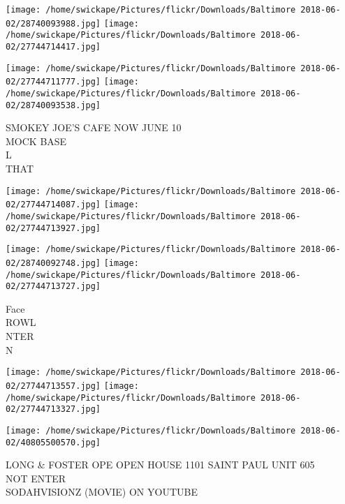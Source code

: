 \documentclass[10pt,letterpaper]{article}
\begin{document}
\texttt{[image: /home/swickape/Pictures/flickr/Downloads/Baltimore 2018-06-02/28740093988.jpg]}
\texttt{[image: /home/swickape/Pictures/flickr/Downloads/Baltimore 2018-06-02/27744714417.jpg]}

\texttt{[image: /home/swickape/Pictures/flickr/Downloads/Baltimore 2018-06-02/27744711777.jpg]}
\texttt{[image: /home/swickape/Pictures/flickr/Downloads/Baltimore 2018-06-02/28740093538.jpg]}

SMOKEY JOE'S CAFE NOW JUNE 10\\
MOCK BASE\\
L\\
THAT
\pagebreak

\texttt{[image: /home/swickape/Pictures/flickr/Downloads/Baltimore 2018-06-02/27744714087.jpg]}
\texttt{[image: /home/swickape/Pictures/flickr/Downloads/Baltimore 2018-06-02/27744713927.jpg]}

\texttt{[image: /home/swickape/Pictures/flickr/Downloads/Baltimore 2018-06-02/28740092748.jpg]}
\texttt{[image: /home/swickape/Pictures/flickr/Downloads/Baltimore 2018-06-02/27744713727.jpg]}

Face\\
ROWL\\
NTER\\
N
\pagebreak

\texttt{[image: /home/swickape/Pictures/flickr/Downloads/Baltimore 2018-06-02/27744713557.jpg]}
\texttt{[image: /home/swickape/Pictures/flickr/Downloads/Baltimore 2018-06-02/27744713327.jpg]}

\texttt{[image: /home/swickape/Pictures/flickr/Downloads/Baltimore 2018-06-02/40805500570.jpg]}

LONG \& FOSTER OPE OPEN HOUSE 1101 SAINT PAUL UNIT 605\\
NOT ENTER\\
SODAHVISIONZ (MOVIE) ON YOUTUBE
\pagebreak
\end{document}
